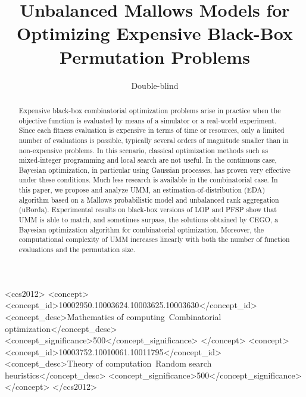 \documentclass[sigconf,dvipsnames]{acmart}
\begin{document}
\title{Unbalanced Mallows Models for Optimizing Expensive Black-Box Permutation Problems}
\author{Double-blind}

\begin{abstract}
  Expensive black-box combinatorial optimization problems arise in practice
  when the objective function is evaluated by means of a simulator or a
  real-world experiment. Since each fitness evaluation is expensive in terms of
  time or resources, only a limited number of evaluations is possible,
  typically several orders of magnitude smaller than in non-expensive problems. In
  this scenario, classical optimization methods such as mixed-integer
  programming and local search are not useful.  In the continuous case,
  Bayesian optimization, in particular using Gaussian processes, has proven
  very effective under these conditions. Much less research is available in the
  combinatorial case. In this paper, we propose and analyze UMM, an
  estimation-of-distribution (EDA) algorithm based on a Mallows probabilistic
  model and unbalanced rank aggregation (uBorda). Experimental results on
  black-box versions of LOP and PFSP show that UMM is able to match, and
  sometimes surpass, the solutions obtained by CEGO, a Bayesian optimization
  algorithm for combinatorial
  optimization. %
  Moreover, the computational complexity of UMM increases linearly with both
  the number of function evaluations and the permutation size.
  \sloppy
\end{abstract}
%
%
\begin{CCSXML}
<ccs2012>
<concept>
<concept_id>10002950.10003624.10003625.10003630</concept_id>
<concept_desc>Mathematics of computing~Combinatorial optimization</concept_desc>
<concept_significance>500</concept_significance>
</concept>
<concept>
<concept_id>10003752.10010061.10011795</concept_id>
<concept_desc>Theory of computation~Random search heuristics</concept_desc>
<concept_significance>500</concept_significance>
</concept>
</ccs2012>
\end{CCSXML}
\end{document}

